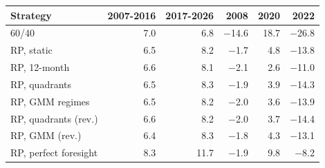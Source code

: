 \begin{tabular}{lrrrrr}
\toprule
Strategy & 2007-2016 & 2017-2026 & 2008 & 2020 & 2022 \\
\midrule
60/40 & 7.0 & 6.8 & $-$14.6 & 18.7 & $-$26.8 \\
RP, static & 6.5 & 8.2 & $-$1.7 & 4.8 & $-$13.8 \\
RP, 12-month & 6.6 & 8.1 & $-$2.1 & 2.6 & $-$11.0 \\
RP, quadrants & 6.5 & 8.3 & $-$1.9 & 3.9 & $-$14.3 \\
RP, GMM regimes & 6.5 & 8.2 & $-$2.0 & 3.6 & $-$13.9 \\
RP, quadrants (rev.) & 6.6 & 8.2 & $-$2.0 & 3.7 & $-$14.4 \\
RP, GMM (rev.) & 6.4 & 8.3 & $-$1.8 & 4.3 & $-$13.1 \\
RP, perfect foresight & 8.3 & 11.7 & $-$1.9 & 9.8 & $-$8.2 \\
\bottomrule
\end{tabular}
